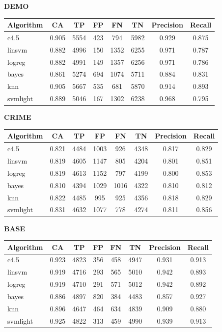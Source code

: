 \documentclass[11pt,letter]{article}
\begin{document}
\textbf{DEMO} \\
\begin{tabular}{|l|c|c|c|c|c|c|c|}
\hline
Algorithm & CA & TP & FP & FN & TN & Precision & Recall\\
\hline
c4.5   	 & 0.905 & 5554  & 423  &  794   & 5982 & 0.929 & 0.875\\
linsvm 	 & 0.882 & 4996  & 150  &  1352  & 6255 & 0.971 & 0.787\\
logreg 	 & 0.882 & 4991  & 149  &  1357  & 6256 & 0.971 & 0.786\\
bayes  	 & 0.861 & 5274  & 694  &  1074  & 5711 & 0.884 & 0.831\\
knn   & 0.905 & 5667  & 535  &  681   & 5870 & 0.914 & 0.893\\
svmlight & 0.889 & 5046  & 167	&  1302	 & 6238 & 0.968 & 0.795\\ 
\hline
\end{tabular}

\textbf{CRIME} \\
\begin{tabular}{|l|c|c|c|c|c|c|c|}
\hline
Algorithm & CA & TP & FP & FN & TN & Precision & Recall\\
\hline
c4.5     & 0.821  &  4484  &  1003  &  926   &  4348 & 0.817 & 0.829\\
linsvm   & 0.819  &  4605  &  1147  &  805   &  4204 & 0.801 & 0.851\\
logreg   & 0.819  &  4613  &  1152  &  797   &  4199 & 0.800 & 0.853\\
bayes    & 0.810  &  4394  &  1029  &  1016  &  4322 & 0.810 & 0.812\\
knn   & 0.822  &  4485  &  995   &  925   &  4356 & 0.818 & 0.829\\
svmlight & 0.831  &  4632  &  1077  &  778   &  4274 & 0.811 & 0.856\\
\hline
\end{tabular}

\textbf{BASE} \\
\begin{tabular}{|l|c|c|c|c|c|c|c|}
\hline
Algorithm & CA & TP & FP & FN & TN & Precision & Recall\\
\hline
c4.5     & 0.923 & 4823 & 356  &  458   &  4947 & 0.931 & 0.913\\ 
linsvm   & 0.919 & 4716 & 293  &  565   &  5010 & 0.942 & 0.893\\ 
logreg   & 0.919 & 4710 & 291  &  571   &  5012 & 0.942 & 0.892\\ 
bayes    & 0.886 & 4897 & 820  &  384   &  4483 & 0.857 & 0.927\\
knn   & 0.896 & 4647 & 464  &  634   &  4839 & 0.909 & 0.880\\
svmlight & 0.925 & 4822 & 313  &  459   &  4990 & 0.939 & 0.913\\
\hline
\end{tabular}
\end{document}
